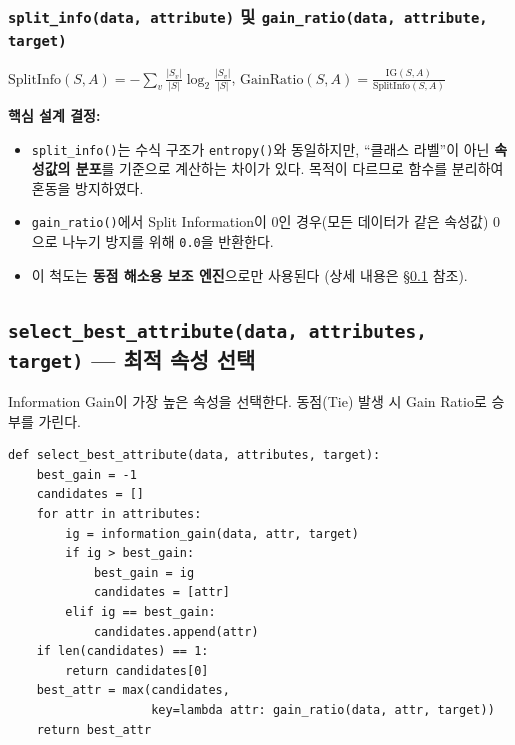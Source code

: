 \documentclass[12pt, a4paper]{article}
\begin{document}
\subsubsection*{\texttt{split\_info(data, attribute)} 및 \texttt{gain\_ratio(data, attribute, target)}}

$\mathrm{SplitInfo}(S, A) = -\sum_v \frac{|S_v|}{|S|} \log_2 \frac{|S_v|}{|S|}$, \quad $\mathrm{GainRatio}(S, A) = \frac{\mathrm{IG}(S, A)}{\mathrm{SplitInfo}(S, A)}$

\noindent\textbf{핵심 설계 결정:}
\begin{itemize}
    \item \texttt{split\_info()}는 수식 구조가 \texttt{entropy()}와 동일하지만, ``클래스 라벨''이 아닌 \textbf{속성값의 분포}를 기준으로 계산하는 차이가 있다. 목적이 다르므로 함수를 분리하여 혼동을 방지하였다.
    \item \texttt{gain\_ratio()}에서 Split Information이 $0$인 경우(모든 데이터가 같은 속성값) 0으로 나누기 방지를 위해 \texttt{0.0}을 반환한다.
    \item 이 척도는 \textbf{동점 해소용 보조 엔진}으로만 사용된다 (상세 내용은 \S\ref{sec:hybrid} 참조).
\end{itemize}


\subsection{\texttt{select\_best\_attribute(data, attributes, target)} --- 최적 속성 선택}
\label{sec:hybrid}

Information Gain이 가장 높은 속성을 선택한다. 동점(Tie) 발생 시 Gain Ratio로 승부를 가린다.

\begin{verbatim}
def select_best_attribute(data, attributes, target):
    best_gain = -1
    candidates = []
    for attr in attributes:
        ig = information_gain(data, attr, target)
        if ig > best_gain:
            best_gain = ig
            candidates = [attr]
        elif ig == best_gain:
            candidates.append(attr)
    if len(candidates) == 1:
        return candidates[0]
    best_attr = max(candidates,
                    key=lambda attr: gain_ratio(data, attr, target))
    return best_attr
\end{verbatim}
\end{document}
